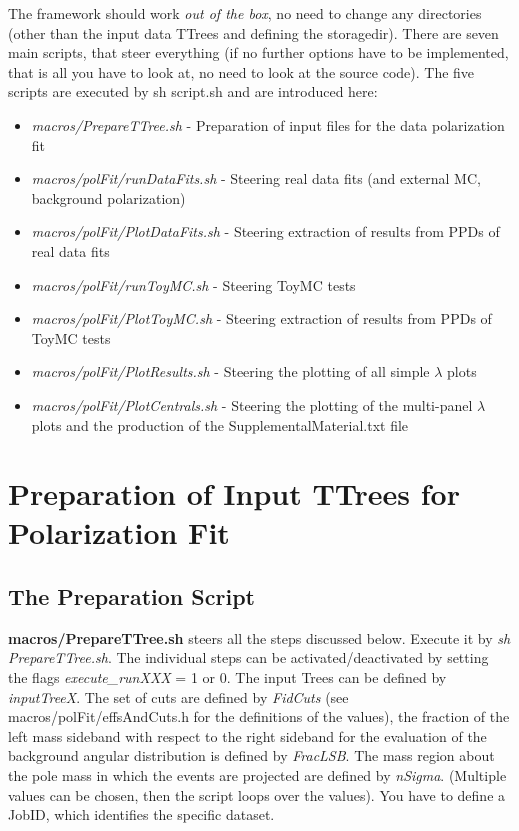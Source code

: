 \documentclass{article}
\begin{document}
The framework should work \emph{out of the box}, no need to change any directories (other than the input data TTrees and defining the storagedir). There are seven main scripts, that steer everything (if no further options have to be implemented, that is all you have to look at, no need to look at the source code). The five scripts are executed by sh script.sh and are introduced here:

\begin{itemize}
\item{\emph{macros/PrepareTTree.sh} - Preparation of input files for the data polarization fit}
\item{\emph{macros/polFit/runDataFits.sh} - Steering real data fits (and external MC, background polarization)}
\item{\emph{macros/polFit/PlotDataFits.sh} - Steering extraction of results from PPDs of real data fits}
\item{\emph{macros/polFit/runToyMC.sh} - Steering ToyMC tests}
\item{\emph{macros/polFit/PlotToyMC.sh} - Steering extraction of results from PPDs of ToyMC tests}
\item{\emph{macros/polFit/PlotResults.sh} - Steering the plotting of all simple $\lambda$ plots}
\item{\emph{macros/polFit/PlotCentrals.sh} - Steering the plotting of the multi-panel $\lambda$ plots and the production of the SupplementalMaterial.txt file}
\end{itemize}

\section{Preparation of Input TTrees for Polarization Fit}

\subsection{The Preparation Script}  

{\bf macros/PrepareTTree.sh} steers all the steps discussed below. Execute it by \emph{sh PrepareTTree.sh}. The individual steps can be activated/deactivated by setting the flags \emph{execute\_runXXX} = 1 or 0. The input Trees can be defined by \emph{inputTreeX}. The set of cuts are defined by \emph{FidCuts} (see macros/polFit/effsAndCuts.h for the definitions of the values), the fraction of the left mass sideband with respect to the right sideband for the evaluation of the background angular distribution is defined by \emph{FracLSB}. The mass region about the pole mass in which the events are projected are defined by \emph{nSigma}. (Multiple values can be chosen, then the script loops over the values).
You have to define a JobID, which identifies the specific dataset.
\end{document}
